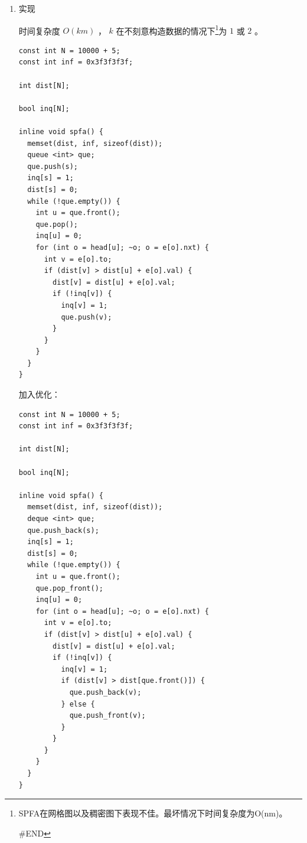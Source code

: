 \documentclass[11pt]{article}
\begin{document}
\begin{enumerate}
\begin{enumerate}
\item SLF
\label{sec-6-6-2-2-2}

$Small\ Label\ First$  策略：设要加入的节点为 $j$ ，队首节点为 $i$ ，如果满足 $dist_j < dist_i$ ，则将其插入到队首，否则插入到队尾。
\end{enumerate}

\item 实现
\label{sec-6-6-2-3}

时间复杂度 $O(km)$ ， $k$ 在不刻意构造数据的情况下\footnote{SPFA在网格图以及稠密图下表现不佳。最坏情况下时间复杂度为O(nm)。

\#END}为 $1$ 或 $2$ 。

\begin{verbatim}
const int N = 10000 + 5;
const int inf = 0x3f3f3f3f;

int dist[N];

bool inq[N];

inline void spfa() {
  memset(dist, inf, sizeof(dist));
  queue <int> que;
  que.push(s);
  inq[s] = 1;
  dist[s] = 0;
  while (!que.empty()) {
    int u = que.front();
    que.pop();
    inq[u] = 0;
    for (int o = head[u]; ~o; o = e[o].nxt) {
      int v = e[o].to;
      if (dist[v] > dist[u] + e[o].val) {
        dist[v] = dist[u] + e[o].val;
        if (!inq[v]) {
          inq[v] = 1;
          que.push(v);
        }
      }
    }
  }
}
\end{verbatim}

加入优化：

\begin{verbatim}
const int N = 10000 + 5;
const int inf = 0x3f3f3f3f;

int dist[N];

bool inq[N];

inline void spfa() {
  memset(dist, inf, sizeof(dist));
  deque <int> que;
  que.push_back(s);
  inq[s] = 1;
  dist[s] = 0;
  while (!que.empty()) {
    int u = que.front();
    que.pop_front();
    inq[u] = 0;
    for (int o = head[u]; ~o; o = e[o].nxt) {
      int v = e[o].to;
      if (dist[v] > dist[u] + e[o].val) {
        dist[v] = dist[u] + e[o].val;
        if (!inq[v]) {
          inq[v] = 1;
          if (dist[v] > dist[que.front()]) {
            que.push_back(v);
          } else {
            que.push_front(v);
          }
        }
      }
    }
  }
}
\end{verbatim}
\end{enumerate}
\end{document}

